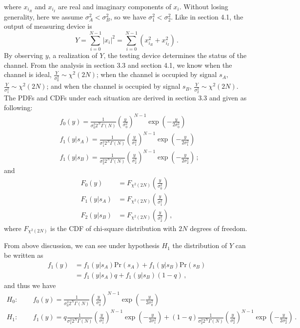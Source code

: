 where $x_{i_R}$ and $x_{i_I}$ are real and imaginary components of $x_i$. 
Without losing generality, here we assume $\sigma_A^2 < \sigma_B^2$, so we have $\sigma_1^2 < \sigma_2^2$. 
Like in section 4.1, the output of measuring device is
\begin{equation} 
  Y = \sum_{i=0}^{N-1}|x_i|^2 = \sum_{i=0}^{N-1}(x_{i_R}^2+x_{i_I}^2)\,.
  \label{equ: testing device2}
\end{equation}
By observing $y$, a realization of $Y$, the testing device determines the status of the channel. From the analysis in section 3.3 and section 4.1, we know when the channel is ideal, $\frac{Y}{\sigma_0^2} \sim \chi^2(2N)$; when the channel is occupied by signal $s_A$, $\frac{Y}{\sigma_1^2} \sim \chi^2(2N)$; and when the channel is occupied by signal $s_B$, $\frac{Y}{\sigma_2^2} \sim \chi^2(2N)$.  The PDFs and CDFs under each situation are derived in section 3.3 and given as following: 
\def \CHISQUY[#1]{\frac{1}{#1 2^N\Gamma(N)}\left(\frac{y}{#1}\right)^{N-1}\exp\left(-\frac{y}{2#1}\right)}
\begin{equation}
  \begin{split}
   &f_0(y) = \CHISQUY[\sigma_0^2]\\
  &f_1(y|s_A)=  \CHISQUY[\sigma_1^2]\\
  &f_1(y|s_B)=  \CHISQUY[\sigma_2^2]\,;
\end{split}
  \label{20150621a4}
\end{equation} 
and
\begin{equation}
  \begin{split}
    F_0(y) &= F_{\chi^2(2N)}(\frac{y}{\sigma_0^2})\\
    F_1(y|s_A) &= F_{\chi^2(2N)}(\frac{y}{\sigma_1^2})\\
    F_2(y|s_B) &= F_{\chi^2(2N)}(\frac{y}{\sigma_2^2})\,,
  \end{split}
\end{equation}
where $F_{\chi^2(2N)}$ is the CDF of chi-square distribution with $2N$ degrees of freedom. 

From above discussion, we can see under hypothesis $H_1$ the distribution of $Y$ can be written as
\begin{equation}
  \begin{split}
    f_1(y) &= f_1(y|s_A)\text{Pr}(s_A) + f_1(y|s_B)\text{Pr}(s_B)\\
         &= f_1(y|s_A)q + f_1(y|s_B)(1-q)\,,
\end{split}
  \label{20150621a7}
\end{equation}
and thus we have
\begin{equation}
  \begin{split}
    H_0:\;\;\;\;\;&f_0(y) = \CHISQUY[\sigma_0^2]\\
    H_1:\;\;\;\;\;&f_1(y) = q\CHISQUY[\sigma_1^2] + (1-q)\CHISQUY[\sigma_2^2]\,.
  \end{split}
  \label{20150621a8}
\end{equation}

